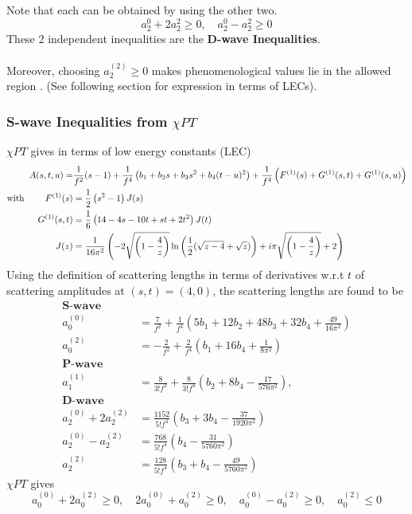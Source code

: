﻿\documentclass[12pt,a4paper]{article}
\begin{document}
Note that each can be obtained by using the other two.
$$a_{2}^{0}+2 a_{2}^{2} \geq 0, \quad a_{2}^{0}-a_{2}^{2} \geq 0$$
These 2 independent inequalities are the \textbf{D-wave Inequalities}.\\\\
Moreover, choosing $a_{2}^{(2)} \geq 0$ makes phenomenological values lie in the allowed region \cite{7}. (See following section for expression in terms of LECs).












\subsubsection{S-wave Inequalities from $\chi PT$}
$\chi PT$ gives in terms of low energy constants (LEC) \cite{7}
$$
\begin{aligned}
A(s, t, u)=& \frac{1}{f^{2}}(s-1)+\frac{1}{f^{4}}\left(b_{1}+b_{2} s+b_{3} s^{2}+b_{4}(t-u)^{2}\right)+\frac{1}{f^{4}}\left(F^{(1)}(s)+G^{(1)}(s, t)+G^{(1)}(s, u)\right) \\
\text{with \qquad}F^{(1)}(s)&=\frac{1}{2}\left(s^{2}-1\right) J(s)\\
G^{(1)}(s, t)&=\frac{1}{6}\left(14-4 s-10 t+s t+2 t^{2}\right) J(t)\\
J(z)&=\frac{1}{16 \pi^{2}}\left(-2 \sqrt{\left(1-\frac{4}{z}\right)} \ln \left(\frac{1}{2}(\sqrt{z-4}+\sqrt{z})\right)+i \pi \sqrt{\left(1-\frac{4}{z}\right)}+2\right)
\end{aligned}
$$
Using the definition of scattering lengths in terms of derivatives w.r.t $t$ of scattering amplitudes at $(s,t)=(4,0)$, the scattering lengths are found to be \cite{7}
$$
\begin{aligned}
\textbf{S-wave}\\
a_{0}^{(0)}&=\frac{7}{f^{2}}+\frac{1}{f^{4}}\left(5 b_{1}+12 b_{2}+48 b_{3}+32 b_{4}+\frac{49}{16 \pi^{2}}\right) \\
a_{0}^{(2)}&=-\frac{2}{f^{2}}+\frac{2}{f^{4}}\left(b_{1}+16 b_{4}+\frac{1}{8 \pi^{2}}\right)\\
\textbf{P-wave}\\
a_{1}^{(1)}&=\frac{8}{3! f^{2}}+\frac{8}{3! f^{4}}\left(b_{2}+8 b_{4}-\frac{17}{576 \pi^{2}}\right),\\
\textbf{D-wave}\\
a_{2}^{(0)}+2 a_{2}^{(2)} &=\frac{1152}{5! f^{4}}\left(b_{3}+3 b_{4}-\frac{37}{1920 \pi^{2}}\right) \\
a_{2}^{(0)}-a_{2}^{(2)} &=\frac{768}{5! f^{4}}\left(b_{4}-\frac{31}{5760 \pi^{2}}\right) \\
a_{2}^{(2)} &=\frac{128}{5! f^{4}}\left(b_{3}+b_{4}-\frac{49}{5760 \pi^{2}}\right)
\end{aligned}
$$
$\chi PT$ gives
$$a_{0}^{(0)}+2 a_{0}^{(2)} \geq 0, \quad 2 a_{0}^{(0)}+a_{0}^{(2)} \geq 0, \quad a_{0}^{(0)}-a_{0}^{(2)} \geq 0, \quad a_{0}^{(2)} \leq 0$$
\end{document}
